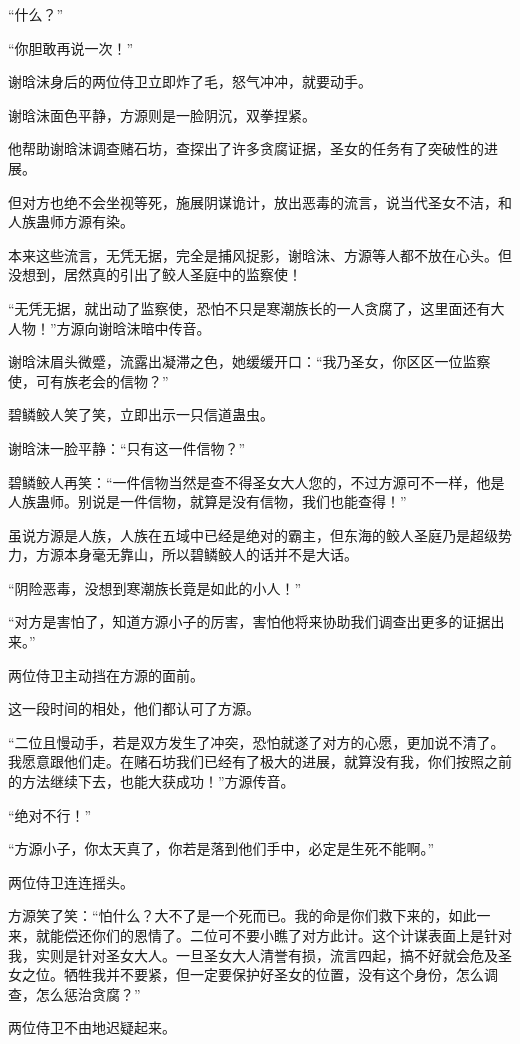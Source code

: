 \begin{this_body}
“什么？”

“你胆敢再说一次！”

谢晗沫身后的两位侍卫立即炸了毛，怒气冲冲，就要动手。

谢晗沫面色平静，方源则是一脸阴沉，双拳捏紧。

他帮助谢晗沫调查赌石坊，查探出了许多贪腐证据，圣女的任务有了突破性的进展。

但对方也绝不会坐视等死，施展阴谋诡计，放出恶毒的流言，说当代圣女不洁，和人族蛊师方源有染。

本来这些流言，无凭无据，完全是捕风捉影，谢晗沫、方源等人都不放在心头。但没想到，居然真的引出了鲛人圣庭中的监察使！

“无凭无据，就出动了监察使，恐怕不只是寒潮族长的一人贪腐了，这里面还有大人物！”方源向谢晗沫暗中传音。

谢晗沫眉头微蹙，流露出凝滞之色，她缓缓开口：“我乃圣女，你区区一位监察使，可有族老会的信物？”

碧鳞鲛人笑了笑，立即出示一只信道蛊虫。

谢晗沫一脸平静：“只有这一件信物？”

碧鳞鲛人再笑：“一件信物当然是查不得圣女大人您的，不过方源可不一样，他是人族蛊师。别说是一件信物，就算是没有信物，我们也能查得！”

虽说方源是人族，人族在五域中已经是绝对的霸主，但东海的鲛人圣庭乃是超级势力，方源本身毫无靠山，所以碧鳞鲛人的话并不是大话。

“阴险恶毒，没想到寒潮族长竟是如此的小人！”

“对方是害怕了，知道方源小子的厉害，害怕他将来协助我们调查出更多的证据出来。”

两位侍卫主动挡在方源的面前。

这一段时间的相处，他们都认可了方源。

“二位且慢动手，若是双方发生了冲突，恐怕就遂了对方的心愿，更加说不清了。我愿意跟他们走。在赌石坊我们已经有了极大的进展，就算没有我，你们按照之前的方法继续下去，也能大获成功！”方源传音。

“绝对不行！”

“方源小子，你太天真了，你若是落到他们手中，必定是生死不能啊。”

两位侍卫连连摇头。

方源笑了笑：“怕什么？大不了是一个死而已。我的命是你们救下来的，如此一来，就能偿还你们的恩情了。二位可不要小瞧了对方此计。这个计谋表面上是针对我，实则是针对圣女大人。一旦圣女大人清誉有损，流言四起，搞不好就会危及圣女之位。牺牲我并不要紧，但一定要保护好圣女的位置，没有这个身份，怎么调查，怎么惩治贪腐？”

两位侍卫不由地迟疑起来。


\end{this_body}
